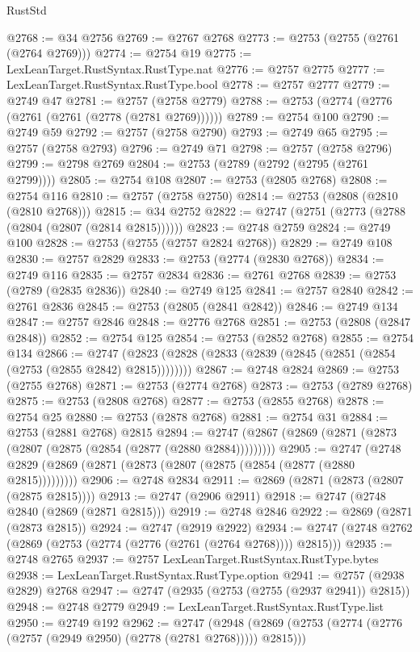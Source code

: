 \begin{lexlean}{RustStd}
\begin{coremodule}
@2768 := @34 @2756
@2769 := @2767 @2768
@2773 := @2753 (@2755 (@2761 (@2764 @2769)))
@2774 := @2754 @19
@2775 := LexLeanTarget.RustSyntax.RustType.nat
@2776 := @2757 @2775
@2777 := LexLeanTarget.RustSyntax.RustType.bool
@2778 := @2757 @2777
@2779 := @2749 @47
@2781 := @2757 (@2758 @2779)
@2788 := @2753 (@2774 (@2776 (@2761 (@2761 (@2778 (@2781 @2769))))))
@2789 := @2754 @100
@2790 := @2749 @59
@2792 := @2757 (@2758 @2790)
@2793 := @2749 @65
@2795 := @2757 (@2758 @2793)
@2796 := @2749 @71
@2798 := @2757 (@2758 @2796)
@2799 := @2798 @2769
@2804 := @2753 (@2789 (@2792 (@2795 (@2761 @2799))))
@2805 := @2754 @108
@2807 := @2753 (@2805 @2768)
@2808 := @2754 @116
@2810 := @2757 (@2758 @2750)
@2814 := @2753 (@2808 (@2810 (@2810 @2768)))
@2815 := @34 @2752
@2822 := @2747 (@2751 (@2773 (@2788 (@2804 (@2807 (@2814 @2815))))))
@2823 := @2748 @2759
@2824 := @2749 @100
@2828 := @2753 (@2755 (@2757 @2824 @2768))
@2829 := @2749 @108
@2830 := @2757 @2829
@2833 := @2753 (@2774 (@2830 @2768))
@2834 := @2749 @116
@2835 := @2757 @2834
@2836 := @2761 @2768
@2839 := @2753 (@2789 (@2835 @2836))
@2840 := @2749 @125
@2841 := @2757 @2840
@2842 := @2761 @2836
@2845 := @2753 (@2805 (@2841 @2842))
@2846 := @2749 @134
@2847 := @2757 @2846
@2848 := @2776 @2768
@2851 := @2753 (@2808 (@2847 @2848))
@2852 := @2754 @125
@2854 := @2753 (@2852 @2768)
@2855 := @2754 @134
@2866 := @2747 (@2823 (@2828 (@2833 (@2839 (@2845 (@2851 (@2854 (@2753 (@2855 @2842) @2815))))))))
@2867 := @2748 @2824
@2869 := @2753 (@2755 @2768)
@2871 := @2753 (@2774 @2768)
@2873 := @2753 (@2789 @2768)
@2875 := @2753 (@2808 @2768)
@2877 := @2753 (@2855 @2768)
@2878 := @2754 @25
@2880 := @2753 (@2878 @2768)
@2881 := @2754 @31
@2884 := @2753 (@2881 @2768) @2815
@2894 := @2747 (@2867 (@2869 (@2871 (@2873 (@2807 (@2875 (@2854 (@2877 (@2880 @2884)))))))))
@2905 := @2747 (@2748 @2829 (@2869 (@2871 (@2873 (@2807 (@2875 (@2854 (@2877 (@2880 @2815)))))))))
@2906 := @2748 @2834
@2911 := @2869 (@2871 (@2873 (@2807 (@2875 @2815))))
@2913 := @2747 (@2906 @2911)
@2918 := @2747 (@2748 @2840 (@2869 (@2871 @2815)))
@2919 := @2748 @2846
@2922 := @2869 (@2871 (@2873 @2815))
@2924 := @2747 (@2919 @2922)
@2934 := @2747 (@2748 @2762 (@2869 (@2753 (@2774 (@2776 (@2761 (@2764 @2768)))) @2815)))
@2935 := @2748 @2765
@2937 := @2757 LexLeanTarget.RustSyntax.RustType.bytes
@2938 := LexLeanTarget.RustSyntax.RustType.option
@2941 := @2757 (@2938 @2829) @2768
@2947 := @2747 (@2935 (@2753 (@2755 (@2937 @2941)) @2815))
@2948 := @2748 @2779
@2949 := LexLeanTarget.RustSyntax.RustType.list
@2950 := @2749 @192
@2962 := @2747
    (@2948 (@2869 (@2753 (@2774 (@2776 (@2757 (@2949 @2950) (@2778 (@2781 @2768))))) @2815)))

\end{coremodule}
\end{lexlean}
